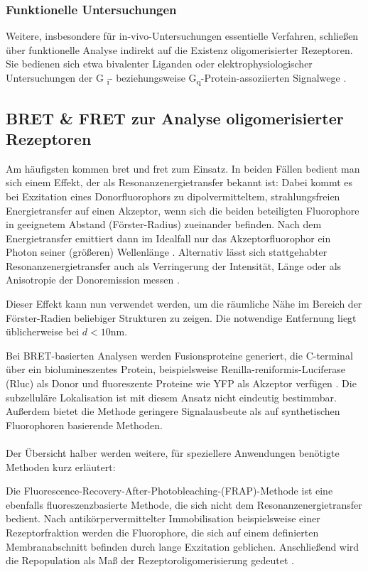 \subsubsection{Funktionelle Untersuchungen}
Weitere, insbesondere für in-vivo-Untersuchungen essentielle Verfahren, schließen über funktionelle Analyse indirekt auf die Existenz oligomerisierter Rezeptoren. Sie bedienen sich etwa bivalenter Liganden \parencite{Daniels2005} oder elektrophysiologischer Untersuchungen der G \textsubscript{i}- beziehungsweise G\textsubscript{q}-Protein-assoziierten Signalwege \parencite{Fribourg2011a}.
 
\subsection{BRET \& FRET zur Analyse oligomerisierter Rezeptoren}
\label{ret}

Am häufigsten kommen \gls{bret} und \gls{fret} zum Einsatz. In beiden Fällen bedient man sich einem Effekt, der als Resonanzenergietransfer bekannt ist: Dabei kommt es bei Exzitation eines Donorfluorophors zu dipolvermitteltem, strahlungsfreien Energietransfer auf einen Akzeptor, wenn sich die beiden beteiligten Fluorophore in geeignetem Abstand (Förster-Radius) zueinander befinden. Nach dem Energietransfer emittiert dann im Idealfall nur das Akzeptorfluorophor ein Photon seiner (größeren) Wellenlänge \parencite{Forster1948}. Alternativ lässt sich stattgehabter Resonanzenergietransfer auch als Verringerung der Intensität, Länge oder als Anisotropie der Donoremission messen \parencite{Rajapakse2010}.

Dieser Effekt kann nun verwendet werden, um die räumliche Nähe im Bereich der Förster-Radien beliebiger Strukturen zu zeigen. Die notwendige Entfernung liegt üblicherweise bei $d<10$\si{\nano\meter}. 

Bei BRET-basierten Analysen werden Fusionsproteine generiert, die C-terminal über ein biolumineszentes Protein, beispielsweise Renilla-reniformis-Luciferase (Rluc) als Donor und fluoreszente Proteine wie YFP als Akzeptor verfügen \parencite{Pfleger2006}. Die subzelluläre Lokalisation ist mit diesem Ansatz nicht eindeutig bestimmbar. Außerdem bietet die Methode geringere Signalausbeute als auf synthetischen Fluorophoren basierende Methoden.
\\ \\
Der Übersicht halber werden weitere, für speziellere Anwendungen benötigte Methoden kurz erläutert:

Die Fluorescence-Recovery-After-Photobleaching-(FRAP)-Methode ist eine ebenfalls fluoreszenzbasierte Methode, die sich nicht dem Resonanzenergietransfer bedient. Nach antikörpervermittelter Immobilisation beispielsweise einer Rezeptorfraktion werden die Fluorophore, die sich auf einem definierten Membranabschnitt befinden durch lange Exzitation geblichen. Anschließend wird die Repopulation als Maß der Rezeptoroligomerisierung gedeutet \parencite{Dorsch2009}.

